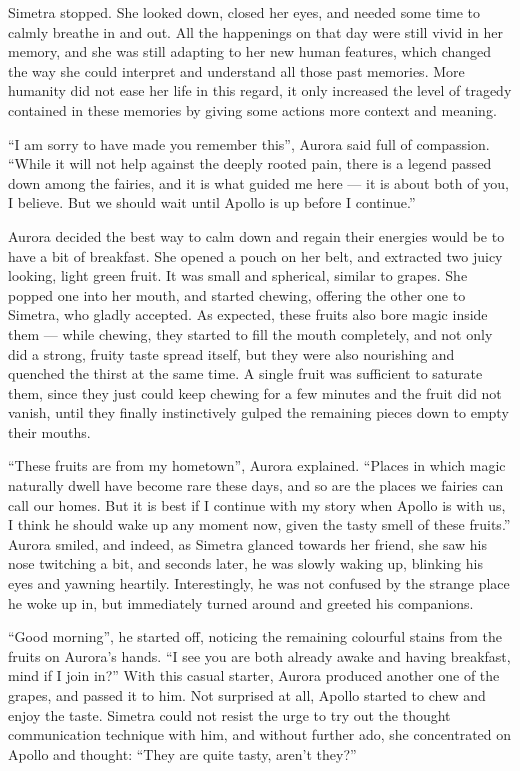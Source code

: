 Simetra stopped. She looked down, closed her eyes, and needed some time to calmly breathe in and out. All the happenings on that day were still vivid in her memory, and she was still adapting to her new human features, which changed the way she could interpret and understand all those past memories. More humanity did not ease her life in this regard, it only increased the level of tragedy contained in these memories by giving some actions more context and meaning.

\enquote{I am sorry to have made you remember this}, Aurora said full of compassion. \enquote{While it will not help against the deeply rooted pain, there is a legend passed down among the fairies, and it is what guided me here --- it is about both of you, I believe. But we should wait until Apollo is up before I continue.}

Aurora decided the best way to calm down and regain their energies would be to have a bit of breakfast. She opened a pouch on her belt, and extracted two juicy looking, light green fruit. It was small and spherical, similar to grapes. She popped one into her mouth, and started chewing, offering the other one to Simetra, who gladly accepted. As expected, these fruits also bore magic inside them --- while chewing, they started to fill the mouth completely, and not only did a strong, fruity taste spread itself, but they were also nourishing and quenched the thirst at the same time. A single fruit was sufficient to saturate them, since they just could keep chewing for a few minutes and the fruit did not vanish, until they finally instinctively gulped the remaining pieces down to empty their mouths.

\enquote{These fruits are from my hometown}, Aurora explained. \enquote{Places in which magic naturally dwell have become rare these days, and so are the places we fairies can call our homes. But it is best if I continue with my story when Apollo is with us, I think he should wake up any moment now, given the tasty smell of these fruits.} Aurora smiled, and indeed, as Simetra glanced towards her friend, she saw his nose twitching a bit, and seconds later, he was slowly waking up, blinking his eyes and yawning heartily. Interestingly, he was not confused by the strange place he woke up in, but immediately turned around and greeted his companions.

\enquote{Good morning}, he started off, noticing the remaining colourful stains from the fruits on Aurora's hands. \enquote{I see you are both already awake and having breakfast, mind if I join in?}
With this casual starter, Aurora produced another one of the grapes, and passed it to him. Not surprised at all, Apollo started to chew and enjoy the taste. Simetra could not resist the urge to try out the thought communication technique with him, and without further ado, she concentrated on Apollo and thought: \enquote{They are quite tasty, aren't they?}

